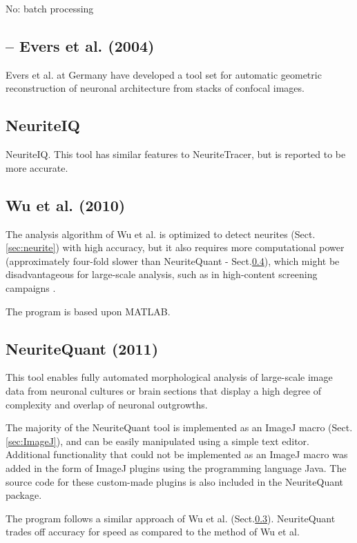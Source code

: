 No: batch processing

\subsection{-- Evers et al. (2004)}

Evers et al. at Germany \citep{evers2004} have developed a tool set for
automatic geometric reconstruction of neuronal architecture from stacks of
confocal images.


\subsection{NeuriteIQ}
\label{sec:NeuriteIQ}

NeuriteIQ. This tool has similar features to NeuriteTracer, but is reported to
be more accurate.

\subsection{Wu et al. (2010)}
\label{sec:Wu-et-al.2010}

The analysis algorithm of Wu et al. is optimized to detect neurites
(Sect.\ref{sec:neurite}) with high accuracy, but it also requires more
computational power (approximately four-fold slower than NeuriteQuant -
Sect.\ref{sec:NeuriteQuant}), which might be disadvantageous for large-scale
analysis, such as in high-content screening campaigns \citep{wu2010}.

The program is based upon MATLAB.


\subsection{NeuriteQuant (2011)}
\label{sec:NeuriteQuant}

This tool enables fully automated morphological analysis of large-scale image
data from neuronal cultures or brain sections that display a high degree of
complexity and overlap of neuronal outgrowths.

The majority of the NeuriteQuant tool is implemented as an ImageJ macro
(Sect.\ref{sec:ImageJ}), and can be easily manipulated using a simple text
editor. Additional functionality that could not be implemented as an ImageJ
macro was added in the form of ImageJ plugins using the programming language
Java. The source code for these custom-made plugins is also included in the
NeuriteQuant package.

The program follows a similar approach of Wu et al.
(Sect.\ref{sec:Wu-et-al.2010}). NeuriteQuant trades off accuracy for speed as
compared to the method of Wu et al.


